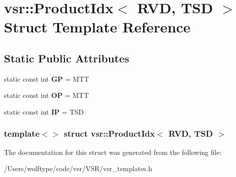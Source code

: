 \hypertarget{structvsr_1_1_product_idx_3_01_r_v_d_00_01_t_s_d_01_4}{\section{vsr\-:\-:Product\-Idx$<$ R\-V\-D, T\-S\-D $>$ Struct Template Reference}
\label{structvsr_1_1_product_idx_3_01_r_v_d_00_01_t_s_d_01_4}
}
\subsection*{Static Public Attributes}
\begin{DoxyCompactItemize}
\item 
\hypertarget{structvsr_1_1_product_idx_3_01_r_v_d_00_01_t_s_d_01_4_ab79d937b16a857aaf9ef39f5e403a7eb}{static const int {\bfseries G\-P} = M\-T\-T}\label{structvsr_1_1_product_idx_3_01_r_v_d_00_01_t_s_d_01_4_ab79d937b16a857aaf9ef39f5e403a7eb}

\item 
\hypertarget{structvsr_1_1_product_idx_3_01_r_v_d_00_01_t_s_d_01_4_a285c0c8cb6772d0da747b5f27ddbee40}{static const int {\bfseries O\-P} = M\-T\-T}\label{structvsr_1_1_product_idx_3_01_r_v_d_00_01_t_s_d_01_4_a285c0c8cb6772d0da747b5f27ddbee40}

\item 
\hypertarget{structvsr_1_1_product_idx_3_01_r_v_d_00_01_t_s_d_01_4_a47179379bd12d94201bb62d924d001aa}{static const int {\bfseries I\-P} = T\-S\-D}\label{structvsr_1_1_product_idx_3_01_r_v_d_00_01_t_s_d_01_4_a47179379bd12d94201bb62d924d001aa}

\end{DoxyCompactItemize}
\subsubsection*{template$<$$>$ struct vsr\-::\-Product\-Idx$<$ R\-V\-D, T\-S\-D $>$}



The documentation for this struct was generated from the following file\-:\begin{DoxyCompactItemize}
\item 
/\-Users/wolftype/code/vsr/\-V\-S\-R/vsr\-\_\-templates.\-h\end{DoxyCompactItemize}
